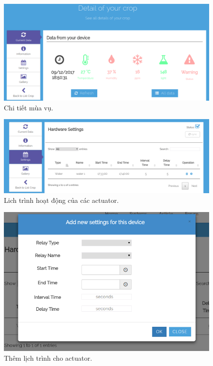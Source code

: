 \documentclass[a4paper,12pt,oneside]{article}
\begin{document}
\begin{center}
\begin{figure}[H]
\begin{center}
\includegraphics[scale=.4]{hinh/web_crop_detail.png}
\end{center}
\caption{Chi tiết mùa vụ.}
\end{figure}

\begin{figure}[H]
\begin{center}
\includegraphics[scale=.4]{hinh/web_schedule.png}
\end{center}
\caption{Lich trình hoạt động của các actuator.}
\end{figure}

\begin{figure}[H]
\begin{center}
\includegraphics[scale=.5]{hinh/web_add_schedule.png}
\end{center}
\caption{Thêm lịch trình cho actuator.}
\end{figure}


\end{center}
\end{document}
